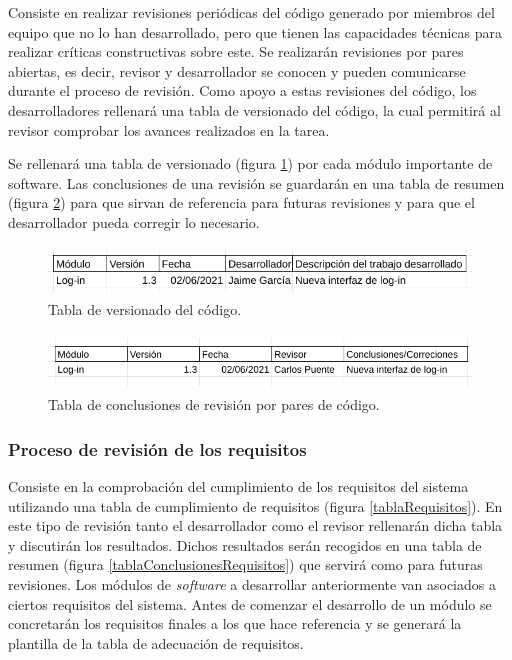 \documentclass{article}
\begin{document}
Consiste en realizar revisiones periódicas del código generado por miembros del equipo que no lo han desarrollado, pero que tienen las capacidades técnicas para realizar críticas constructivas sobre este. Se realizarán revisiones por pares abiertas, es decir, revisor y desarrollador se conocen y pueden comunicarse durante el proceso de revisión. Como apoyo a estas revisiones del código, los desarrolladores rellenará una tabla de versionado del código, la cual permitirá al revisor comprobar los avances realizados en la tarea.

Se rellenará una tabla de versionado (figura \ref{tablaVersionado}) por cada módulo importante de software. Las conclusiones de una revisión se guardarán en una tabla de resumen (figura \ref{tablaConclusionesPares}) para que sirvan de referencia para futuras revisiones y para que el desarrollador pueda corregir lo necesario.

\begin{figure}[H]
   \centering
       \includegraphics[height=1.3cm]{../images/tabla_versionado_code.png}
   \caption{Tabla de versionado del código.}
   \label{tablaVersionado}
\end{figure}

\begin{figure}[H]
   \centering
       \includegraphics[height=1.5cm]{../images/tabla_conclusiones_revision_pares.png}
   \caption{Tabla de conclusiones de revisión por pares de código.}
   \label{tablaConclusionesPares}
\end{figure}

\subsubsection{Proceso de revisión de los requisitos} \label{P.EC.13}

Consiste en la comprobación del cumplimiento de los requisitos del sistema utilizando una tabla de cumplimiento de requisitos (figura \ref{tablaRequisitos}). En este tipo de revisión tanto el desarrollador como el revisor rellenarán dicha tabla y discutirán los resultados. Dichos resultados serán recogidos en una tabla de resumen (figura \ref{tablaConclusionesRequisitos}) que servirá como para futuras revisiones. Los módulos de \textit{software} a desarrollar anteriormente van asociados a ciertos requisitos del sistema. Antes de comenzar el desarrollo de un módulo se concretarán los requisitos finales a los que hace referencia y se generará la plantilla de la tabla de adecuación de requisitos.
\end{document}
